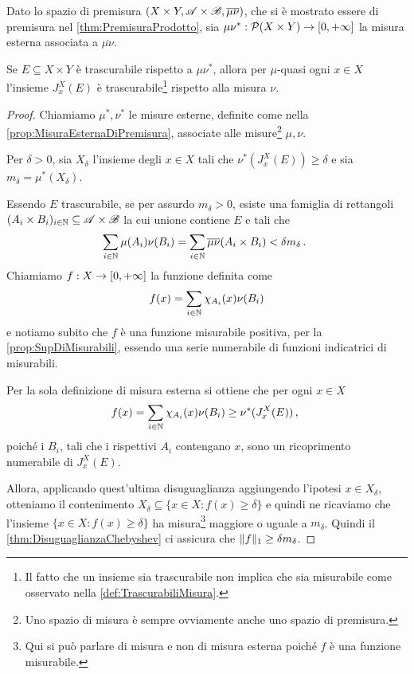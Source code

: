 \begin{proposition}\label{prop:TrascurabiliProdotto}
	Dato lo spazio di premisura $(X\times Y,\mathscr A\times\mathscr B,\overline{\mu\nu})$, che si è mostrato essere di premisura nel \cref{thm:PremisuraProdotto}, sia $\mu\nu^*:\mathcal P(X\times Y)\to[0,+\infty]$ la misura esterna associata a $\overline{\mu\nu}$.
	
	Se $E\subseteq X\times Y$ è trascurabile rispetto a $\mu\nu^*$, allora per $\mu$-quasi ogni $x\in X$ l'insieme $J_x^X(E)$ è trascurabile\footnote{Il fatto che un insieme sia trascurabile non implica che sia misurabile come osservato nella \cref{def:TrascurabiliMisura}.} rispetto alla misura $\nu$.
\end{proposition}
\begin{proof}
	Chiamiamo $\mu^*,\nu^*$ le misure esterne, definite come nella \cref{prop:MisuraEsternaDiPremisura}, associate alle misure\footnote{Uno spazio di misura è sempre ovviamente anche uno spazio di premisura.} $\mu,\nu$.
	
	Per $\delta>0$, sia $X_\delta$ l'insieme degli $x\in X$ tali che $\nu^*(J_x^X(E))\ge\delta$ e sia $m_\delta=\mu^*(X_\delta)$.
	
	Essendo $E$ trascurabile, se per assurdo $m_\delta>0$, esiste una famiglia di rettangoli $(A_i\times B_i)_{i\in\mathbb N}\subseteq \mathscr A\times\mathscr B$ la cui unione contiene $E$ e tali che
	\begin{equation*}
		\sum_{i\in\mathbb N}\mu(A_i)\nu(B_i)=\sum_{i\in\mathbb N}\overline{\mu\nu}(A_i\times B_i)< \delta m_\delta \, \text{. }
	\end{equation*}
	Chiamiamo $f:X\to[0,+\infty]$ la funzione definita come
	\begin{equation*}
		f(x)=\sum_{i\in\mathbb N}\chi_{A_i}(x)\nu(B_i)
	\end{equation*}
	e notiamo subito che $f$ è una funzione misurabile positiva, per la \cref{prop:SupDiMisurabili}, essendo una serie numerabile di funzioni indicatrici di misurabili.
	
	Per la sola definizione di misura esterna si ottiene che per ogni $x\in X$
	\begin{equation*}\label{eq:DisTrascurabiliProdotto}
		f(x)=\sum_{i\in\mathbb N}\chi_{A_i}(x)\nu(B_i)\ge\nu^*(J_x^X(E))\, \text{, }
	\end{equation*}
	poiché i $B_i$, tali che i rispettivi $A_i$ contengano $x$, sono un ricoprimento numerabile di $J_x^X(E)$.
	
	Allora, applicando quest'ultima disuguaglianza aggiungendo l'ipotesi $x\in X_\delta$, otteniamo il contenimento $X_\delta\subseteq \{x\in X:f(x)\ge\delta\}$ e quindi ne ricaviamo che l'insieme $\{x\in X:f(x)\ge\delta\}$ ha misura\footnote{Qui si può parlare di misura e non di misura esterna poiché $f$ è una funzione misurabile.} maggiore o uguale a $m_\delta$.
	Quindi il \cref{thm:DisuguaglianzaChebyshev} ci assicura che $\Vert f\Vert_1\ge \delta m_\delta$.


\end{proof}
